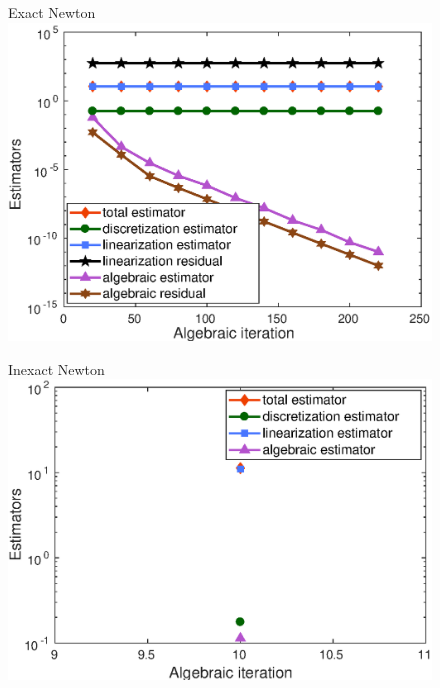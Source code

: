 \documentclass{beamer}
\begin{document}
\begin{frame}
\begin{figure}
\begin{minipage}[c]{.33\linewidth}
   \centering
   Exact Newton
\includegraphics[width=\textwidth]{fig_article/exact_resolution_estimators_gmres_iter_inside_first_newton_iter_Hmax_015.eps}    
\end{minipage}\hfill
\begin{minipage}[c]{.34\linewidth}
   \centering
   Inexact Newton
\includegraphics[width=\textwidth]{fig_article/inexacte_resolution_Hmax_015_number_gmres_iter_inside_first_newton_step.eps}    
\end{minipage}\hfill

\end{figure}
\end{frame}
\end{document}
